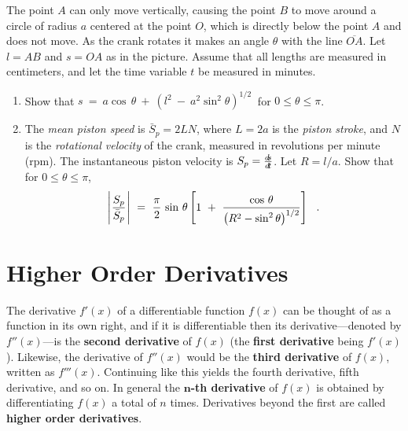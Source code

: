 {\begin{enumerate}[item-label={\bfseries \arabic*.}]
The point $A$ can only move vertically, causing the point $B$ to move around a circle
of radius $a$ centered at the point $O$, which is directly below the point $A$ and
does not move. As the crank rotates it makes an
angle $\theta$ with the line $\overline{OA}$. Let $l = AB$ and $s = OA$ as in
the picture. Assume that all lengths are measured in centimeters, and let the time
variable $t$ be measured in minutes.
 \begin{enumerate}[item-label={\bfseries (\alph*)}]
  \item Show that $s ~=~ a \cos\,\theta ~+~ \left(l^2 ~-~ a^2 \sin^2\theta\right)^{1/2}~$
  for $0 \le \theta \le \pi$.
  \item The \emph{mean piston speed} is $\bar{S}_p = 2LN$, where $L = 2a$ is the
   \emph{piston stroke}, and $N$ is the \emph{rotational velocity} of
   the crank, measured in revolutions per minute (rpm). The instantaneous piston velocity
   is $S_p = \frac{d\negmedspace s}{d\!t}$. Let $R = l/a$. Show that for $0 \le \theta \le \pi$,
\begin{displaymath}
 \Biggl\lvert\mspace{1mu}\frac{S_p}{\bar{S}_p}\mspace{1mu}\Biggr\rvert ~=~ \frac{\pi}{2}\,\sin\,\theta
 \left[1 ~+~ \frac{\cos\,\theta}{\left(R^2 - \sin^2\theta\right)^{1/2}}\right] ~~.
\end{displaymath}
 \end{enumerate}
\end{enumerate}}
\newpage
\section{Higher Order Derivatives}
The derivative $f'(x)$ of a differentiable function $f(x)$ can be thought of as
a function in its own right, and if it is differentiable then its
derivative---denoted by $f''(x)$---is the
\textbf{second derivative} of $f(x)$ (the
\textbf{first derivative} being $f'(x)$). Likewise, the
derivative of $f''(x)$ would be the \textbf{third derivative} of $f(x)$, written
as $f'''(x)$. Continuing like this yields the fourth derivative, fifth
derivative, and so on. In general the
\textbf{$\bm{n}$-th derivative} of $f(x)$ is
obtained by differentiating $f(x)$ a total of $n$ times. Derivatives beyond the
first are called \textbf{higher order derivatives}.

